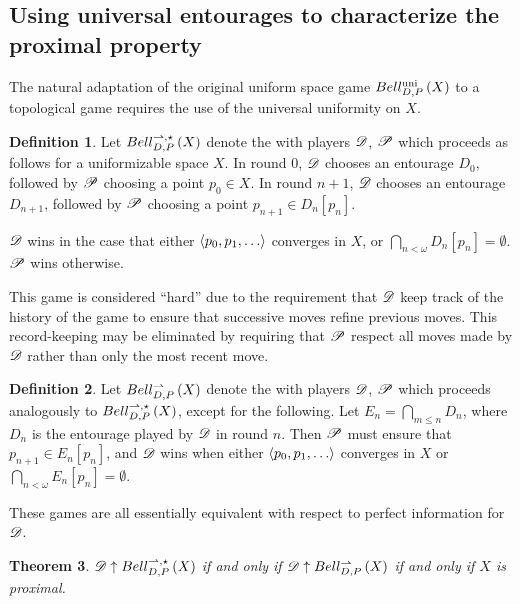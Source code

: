 \documentclass{amsart}
\newtheorem{theorem}{Theorem}[section]
\theoremstyle{definition}
\newtheorem{definition}[theorem]{Definition}
\begin{document}
\subsection{Using universal entourages to characterize the proximal property}

  The natural adaptation of the original uniform space game \(Bell_{D,P}^{\textrm{uni}}\left({X}\right)\)
  to a topological game requires the use of the universal uniformity on \(X\).

  \begin{definition}
    Let \(Bell_{D,P}^{\rightharpoonup,\star}\left({X}\right)\) denote the  with
    players \(\mathscr{D}\), \(\mathscr{P}\) which proceeds as follows for
    a uniformizable space \(X\). In round \(0\),
    \(\mathscr{D}\) chooses an entourage \(D_0\), followed by \(\mathscr{P}\)
    choosing a point \(p_0\in X\). In round \(n+1\),
    \(\mathscr{D}\) chooses an entourage
    \(D_{n+1}\), followed by \(\mathscr{P}\) choosing a point \(p_{n+1}\in D_n[p_n]\).

    \(\mathscr{D}\) wins in the case that either
    \(\<p_0,p_1,\dots\>\) converges in \(X\),
    or \(\bigcap_{n<\omega}D_n[p_n] = \emptyset\). \(\mathscr{P}\) wins otherwise.
  \end{definition}

  This game is considered ``hard'' due to the requirement that \(\mathscr{D}\)
  keep track of the history of the game to ensure that successive
  moves refine previous moves. This record-keeping may be eliminated by
  requiring that \(\mathscr{P}\) respect all moves made by \(\mathscr{D}\) rather than only
  the most recent move.

  \begin{definition}
    Let \(Bell_{D,P}^{\rightharpoonup}\left({X}\right)\) denote the  with players
    \(\mathscr{D}\), \(\mathscr{P}\) which proceeds analogously to \(Bell_{D,P}^{\rightharpoonup,\star}\left({X}\right)\),
    except for the following. Let \(E_n=\bigcap_{m\leq n}D_n\), where \(D_n\) is
    the entourage played by \(\mathscr{D}\) in round \(n\).
    Then \(\mathscr{P}\) must ensure that \(p_{n+1}\in E_n[p_n]\),
    and \(\mathscr{D}\) wins when either \(\<p_0,p_1,\dots\>\) converges in \(X\)
    or \(\bigcap_{n<\omega}E_n[p_n] = \emptyset\).
  \end{definition}

  These games are all essentially equivalent with respect to perfect
  information for \(\mathscr{D}\).

  \begin{theorem}
    \(\mathscr{D}\uparrow Bell_{D,P}^{\rightharpoonup,\star}\left({X}\right)\) if and only if
    \(\mathscr{D}\uparrow Bell_{D,P}^{\rightharpoonup}\left({X}\right)\) if and only if
    \(X\) is proximal.
  \end{theorem}
\end{document}
